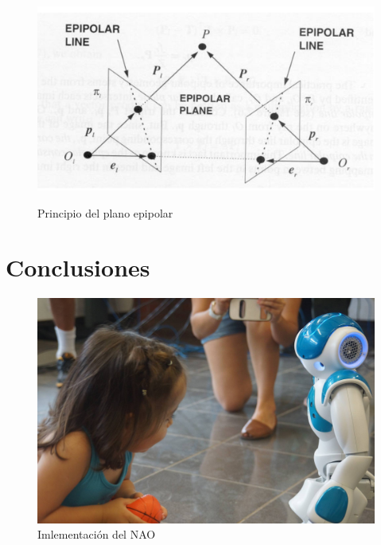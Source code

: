 \documentclass[11pt,letterpaper]{article}     %
\begin{document}
\begin{figure}[hbtp]
\caption{Principio del plano epipolar}
\centering
\includegraphics[scale=0.4]{imagenes/planoEpipolar.png}
\label{fig:epipolar}
\end{figure}


\section{Conclusiones}
\begin{figure}[hbtp]
\caption{Imlementaci\' on del NAO}
\centering
\includegraphics[scale=0.15]{imagenes/10553806_792493910785449_7200970304906961642_o.jpg}
\end{figure}




\newpage
\renewcommand{\bibname}{Referencias}
\end{document}
